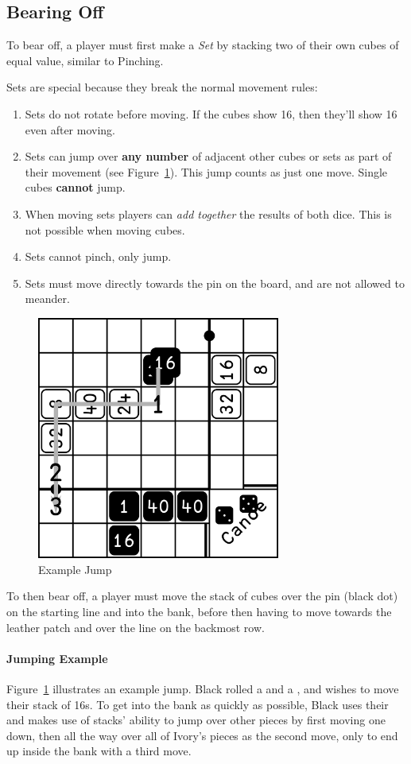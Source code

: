 \subsection{Bearing Off}\label{sec:bearing-off}
To bear off, a player must first make a \textit{Set} by stacking two of their own cubes of equal value, similar to Pinching.

Sets are special because they break the normal movement rules:
\begin{enumerate}
    \item Sets do not rotate before moving. If the cubes show 16, then they'll show 16 even after moving.
    \item Sets can jump over \textbf{any number} of adjacent other cubes or sets as part of their movement (see Figure~\ref{fig:jump}). This jump counts as just one move. Single cubes \textbf{cannot} jump.
    \item When moving sets players can \textit{add together} the results of both dice. This is not possible when moving cubes.
    \item Sets cannot pinch, only jump.
    \item Sets must move directly towards the pin on the board, and are not allowed to meander.
\end{enumerate}
\begin{figure}[!h]
    \centering
    \includegraphics[width=8cm]{../graphics/jump}
    \caption{Example Jump}
    \label{fig:jump}
\end{figure}
To then bear off, a player must move the stack of cubes over the pin (black dot) on the starting line and into the bank, before then having to move towards the leather patch and over the line on the backmost row.

\paragraph{Jumping Example}
Figure~\ref{fig:jump} illustrates an example jump.
Black rolled a  and a , and wishes to move their stack of 16s.
To get into the bank as quickly as possible, Black uses their  and makes use of stacks' ability to jump over other pieces by first moving one down, then all the way over all of Ivory's pieces as the second move, only to end up inside the bank with a third move.


